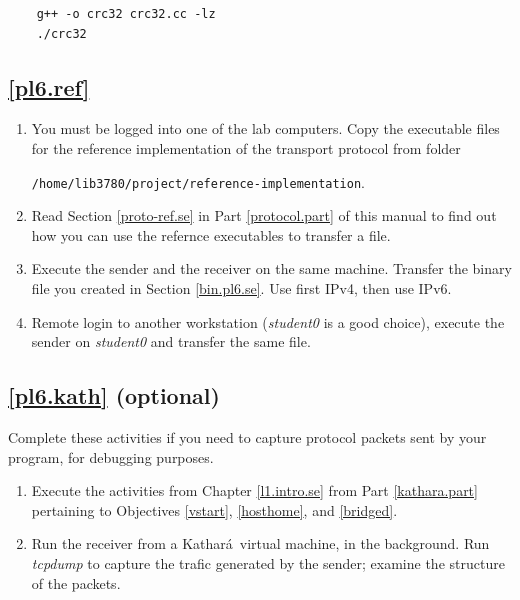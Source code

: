 \documentclass[12pt]{book}
\newcommand{\kathara}{Kathar\'a}
\begin{document}
\begin{enumerate}[label=\arabic*.]
\begin{enumerate}[resume*]
  \begin{lstlisting}
    g++ -o crc32 crc32.cc -lz
    ./crc32
  \end{lstlisting}

\end{enumerate}


\subsection{\ref{pl6.ref}}

\begin{enumerate}[resume*]
\item You must be logged into one of the lab computers. Copy the executable files for the reference implementation of the transport protocol from folder

  \verb$/home/lib3780/project/reference-implementation$.

\item Read Section \ref{proto-ref.se} in Part \ref*{protocol.part} of this manual to find out how you can use the refernce executables to transfer a file.

\item Execute the sender and the receiver on the same machine. Transfer the binary file you created in Section \ref{bin.pl6.se}. Use first IPv4, then use IPv6.

\item Remote login to another workstation (\emph{student0} is a good choice), execute the sender on \emph{student0} and transfer the same file.
\end{enumerate}


\subsection{\ref{pl6.kath} (optional)}

Complete these activities if you need to capture protocol packets sent by your program, for debugging purposes.

\begin{enumerate}[resume*]
\item Execute the activities from Chapter \ref{l1.intro.se} from Part \ref{kathara.part} pertaining to Objectives \ref{vstart}, \ref{hosthome}, and \ref{bridged}.

\item Run the receiver from a \kathara\ virtual machine, in the background. Run \emph{tcpdump} to capture the trafic generated by the sender; examine the structure of the packets.
\end{enumerate}



\end{enumerate}
\end{document}
